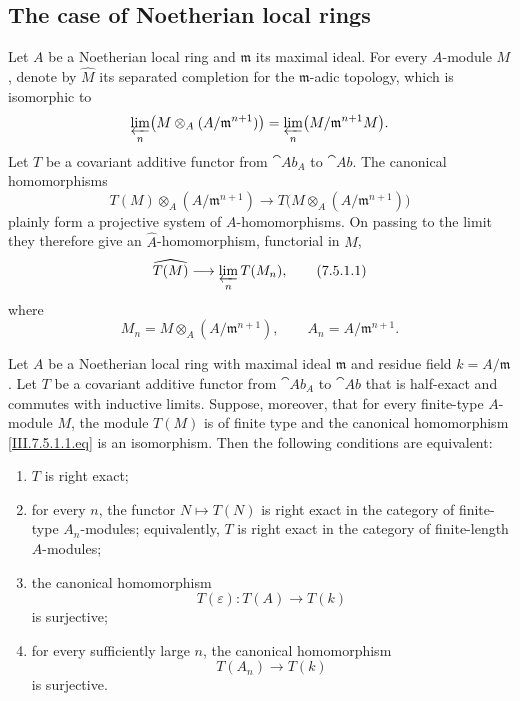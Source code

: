 \subsection{The case of Noetherian local rings}
\label{subsection:III.7.5}

\begin{env}[7.5.1]
\label{III.7.5.1}
Let $A$ be a Noetherian local ring and $\mathfrak m$ its
maximal ideal.  For every $A$-module $M$, denote by
$\widehat M$ its separated completion for the
$\mathfrak m$-adic topology, which is isomorphic to
\[
  \varprojlim_n
  \bigl(M\otimes_A(A/\mathfrak m^{n+1})\bigr)
  =
  \varprojlim_n
  \bigl(M/\mathfrak m^{n+1}M\bigr).
\]
Let $T$ be a covariant additive functor from $\cat{Ab}_A$ to
$\cat{Ab}$.  The canonical homomorphisms
\[
  T(M)\otimes_A(A/\mathfrak m^{n+1})
  \longrightarrow
  T\bigl(M\otimes_A(A/\mathfrak m^{n+1})\bigr)
\]
plainly form a projective system of $A$-homomorphisms.  On
passing to the limit they therefore give an
$\widehat A$-homomorphism, functorial in $M$,
\[
  \widehat{T(M)}
  \longrightarrow
  \varprojlim_n T(M_n),
  \tag{7.5.1.1}\label{III.7.5.1.1.eq}
\]
where
\[
  M_n=M\otimes_A(A/\mathfrak m^{n+1}),
  \qquad
  A_n=A/\mathfrak m^{n+1}.
\]
\end{env}

\begin{proposition}[7.5.2]
\label{III.7.5.2}
Let $A$ be a Noetherian local ring with maximal ideal
$\mathfrak m$ and residue field $k=A/\mathfrak m$.  Let $T$
be a covariant additive functor from $\cat{Ab}_A$ to
$\cat{Ab}$ that is half-exact and commutes with inductive
limits.  Suppose, moreover, that for every finite-type
$A$-module $M$, the module $T(M)$ is of finite type and the
canonical homomorphism \eqref{III.7.5.1.1.eq} is an
isomorphism.  Then the following conditions are equivalent:
\begin{enumerate}
  \item[(a)] $T$ is right exact;
  \item[(b)] for every $n$, the functor $N\mapsto T(N)$ is
    right exact in the category of finite-type $A_n$-modules;
    equivalently, $T$ is right exact in the category of
    finite-length $A$-modules;
  \item[(c)] the canonical homomorphism
    \[
      T(\varepsilon):T(A)\longrightarrow T(k)
    \]
    is surjective;
  \item[(d)] for every sufficiently large $n$, the canonical
    homomorphism
    \[
      T(A_n)\longrightarrow T(k)
    \]
    is surjective.
\end{enumerate}
\end{proposition}

